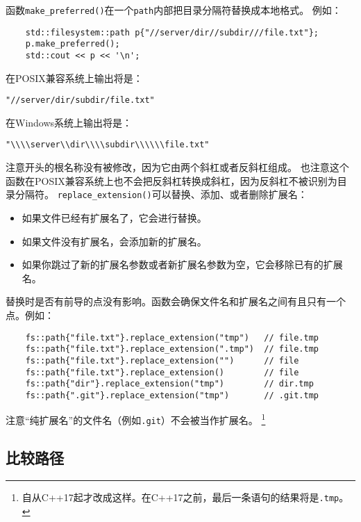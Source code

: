 函数\texttt{make\_preferred()}在一个\texttt{path}内部把目录分隔符替换成本地格式。
例如：
\begin{lstlisting}
    std::filesystem::path p{"//server/dir//subdir///file.txt"};
    p.make_preferred();
    std::cout << p << '\n';
\end{lstlisting}
在POSIX兼容系统上输出将是：
\begin{lstlisting}[stringstyle=\color{black}]
    "//server/dir/subdir/file.txt"
\end{lstlisting}
在Windows系统上输出将是：
\begin{lstlisting}[stringstyle=\color{black}]
    "\\\\server\\dir\\\\subdir\\\\\\file.txt"
\end{lstlisting}
注意开头的根名称没有被修改，因为它由两个斜杠或者反斜杠组成。
也注意这个函数在POSIX兼容系统上也不会把反斜杠转换成斜杠，因为反斜杠不被识别为目录分隔符。
\texttt{replace\_extension()}可以替换、添加、或者删除扩展名：
\begin{itemize}
    \item 如果文件已经有扩展名了，它会进行替换。
    \item 如果文件没有扩展名，会添加新的扩展名。
    \item 如果你跳过了新的扩展名参数或者新扩展名参数为空，它会移除已有的扩展名。
\end{itemize}
替换时是否有前导的点没有影响。函数会确保文件名和扩展名之间有且只有一个点。例如：
\begin{lstlisting}
    fs::path{"file.txt"}.replace_extension("tmp")   // file.tmp
    fs::path{"file.txt"}.replace_extension(".tmp")  // file.tmp
    fs::path{"file.txt"}.replace_extension("")      // file
    fs::path{"file.txt"}.replace_extension()        // file
    fs::path{"dir"}.replace_extension("tmp")        // dir.tmp
    fs::path{".git"}.replace_extension("tmp")       // .git.tmp
\end{lstlisting}
注意“纯扩展名”的文件名（例如\texttt{.git}）不会被当作扩展名。
\footnote{自从C++17起才改成这样。在C++17之前，最后一条语句的结果将是\texttt{.tmp}。}

\subsection{比较路径}

